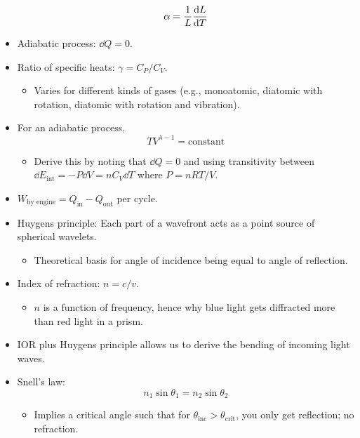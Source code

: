 \documentclass[../notes.tex]{subfiles}
\begin{document}
\begin{itemize}
\begin{equation*}
        \alpha = \frac{1}{L}\dv{L}{T}
    \end{equation*}
    \item Adiabatic process: $\dd{Q}=0$.
    \item Ratio of specific heats: $\gamma=C_P/C_V$.
    \begin{itemize}
        \item Varies for different kinds of gases (e.g., monoatomic, diatomic with rotation, diatomic with rotation and vibration).
    \end{itemize}
    \item For an adiabatic process,
    \begin{equation*}
        TV^{\lambda-1} = \text{constant}
    \end{equation*}
    \begin{itemize}
        \item Derive this by noting that $\dd{Q}=0$ and using transitivity between $\dd{E_\text{int}}=-P\dd{V}=nC_V\dd{T}$ where $P=nRT/V$.
    \end{itemize}
    \item $W_\text{by engine}=Q_\text{in}-Q_\text{out}$ per cycle.
    \item Huygens principle: Each part of a wavefront acts as a point source of spherical wavelets.
    \begin{itemize}
        \item Theoretical basis for angle of incidence being equal to angle of reflection.
    \end{itemize}
    \item Index of refraction: $n=c/v$.
    \begin{itemize}
        \item $n$ is a function of frequency, hence why blue light gets diffracted more than red light in a prism.
    \end{itemize}
    \item IOR plus Huygens principle allows us to derive the bending of incoming light waves.
    \item Snell's law:
    \begin{equation*}
        n_1\sin\theta_1 = n_2\sin\theta_2
    \end{equation*}
    \begin{itemize}
        \item Implies a critical angle such that for $\theta_\text{inc}>\theta_\text{crit}$, you only get reflection; no refraction.
    \end{itemize}

\end{itemize}
\end{document}
